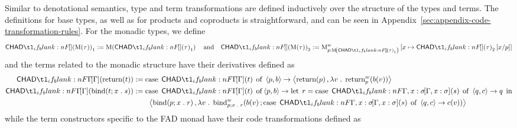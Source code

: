 \documentclass[11pt,a4paper]{article}
\theoremstyle{definition}
\theoremstyle{remark}
\providecommand{\casubst}[3]{#1[#3/#2]}
\begin{document}
Similar to denotational semantics, type and term transformations are defined inductively over the structure of the types and terms. The definitions for base types, as well as for products and coproducts is straightforward, and can be seen in Appendix~\ref{sec:appendix-code-transformation-rules}. For the monadic types, we define
\begin{equation}
  \label{eq:chad-code-transformation-measure-type-derivative}
  \Fun[np]{ \chad }{ \Fun[nn]{ \opn[b]{M} }{ \tau } }_{1} :=
  \Fun[nn]{ \opn[b]{M} }{ \Fun[nn]{ \chad }{ \tau }_{1} }
  \qq{and}
  \Fun[np]{ \chad }{ \Fun[nn]{ \opn[b]{M} }{ \tau } }_{2} :=
  \opn[b]{M}^{w}_{p : \Fun[nn]{ \opn[b]{M} }{ \Fun[np]{ \chad }{ \tau }_{1} }}
  \left[
    x \mapsto \casubst{ \Fun[np]{ \chad }{ \tau }_{2} }{p}{x}
  \right]
\end{equation}
and the terms related to the monadic structure have their derivatives defined as
\begin{align}
  \Fun[np]{ \chad[\Gamma] }{ \fn[n]{ \opn[b]{return} }{ t } }
  &:=
  \opn[b]{case} \; \Fun[np]{ \chad[\Gamma] }{ t } \; \opn[b]{of} \;
  \tuple{ p, b } \to
  \tuple{
    \fn[n]{ \opn[b]{return} }{ p },
    \lambda v \; . \; \fn[n]{ \opn[b]{return}^{w}_{p} }{ \fn[n]{ b }{ v } }
  }
  \label{eq:chad-code-transformation-return}
  \\
  \Fun[np]{ \chad[\Gamma] }{ \fn[n]{ \opn[b]{bind} }{ t; x \; . \; s } }
  &:=
  \opn[b]{case} \; \Fun[nn]{ \chad[\Gamma] }{ t } \; \opn[b]{of}
  \tuple{ p, b } \to
  \opn[b]{let} \; r =
  \opn[b]{case} \; \Fun[nn]{ \chad[\Gamma, x : \sigma] }{ s } \; \opn[b]{of} \;
  \tuple{ q, c } \to q
  \; \opn[b]{in}
  \label{eq:chad-code-transformation-bind}
  \\
  &\qquad
  \tuple{
    \fn[n]{ \opn[b]{bind} }{ p; x \; . \; r },
    \lambda v \; . \;
    \fn[n]{ \opn[b]{bind}^{w}_{p; x \; . \; r} }{
      \fn[n]{ b }{ v };
      \fn[p]{
        \opn[b]{case} \; \Fun[nn]{ \chad[\Gamma, x : \sigma] }{ s } \; \opn[b]{of} \;
        \tuple{ q, c } \to c
      }{ v }
    }
  }
  \notag
\end{align}
while the term constructors specific to the FAD monad have their code transformations defined as
\end{document}

